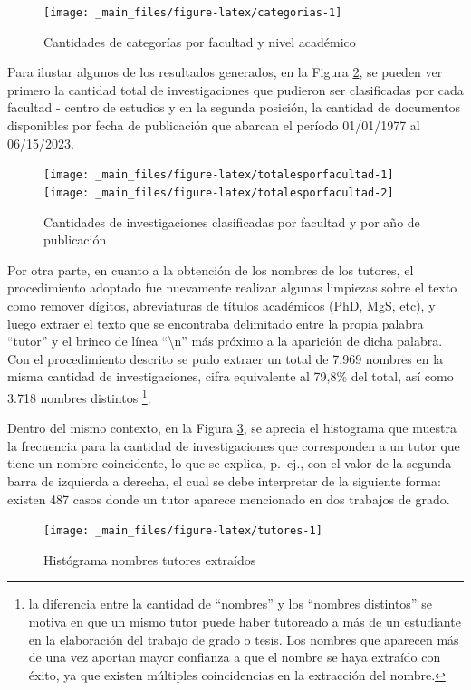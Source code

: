 \documentclass[
  12pt,
  openany]{book}
\begin{document}
\begin{figure}
\texttt{[image: \_main\_files/figure-latex/categorias-1]} \caption{Cantidades de categorías por facultad y nivel académico}\label{fig:categorias}
\end{figure}

Para ilustar algunos de los resultados generados, en la Figura \ref{fig:totalesporfacultad}, se pueden ver primero la cantidad total de investigaciones que pudieron ser clasificadas por cada facultad - centro de estudios y en la segunda posición, la cantidad de documentos disponibles por fecha de publicación que abarcan el período 01/01/1977 al 06/15/2023.

\begin{figure}
\texttt{[image: \_main\_files/figure-latex/totalesporfacultad-1]} \texttt{[image: \_main\_files/figure-latex/totalesporfacultad-2]} \caption{Cantidades de investigaciones clasificadas por facultad y por año de publicación}\label{fig:totalesporfacultad}
\end{figure}

Por otra parte, en cuanto a la obtención de los nombres de los tutores, el procedimiento adoptado fue nuevamente realizar algunas limpiezas sobre el texto como remover dígitos, abreviaturas de títulos académicos (PhD, MgS, etc), y luego extraer el texto que se encontraba delimitado entre la propia palabra ``tutor'' y el brinco de línea ``\textbackslash n'' más próximo a la aparición de dicha palabra. Con el procedimiento descrito se pudo extraer un total de 7.969 nombres en la misma cantidad de investigaciones, cifra equivalente al 79,8\% del total, así como 3.718 nombres distintos \footnote{la diferencia entre la cantidad de ``nombres'' y los ``nombres distintos'' se motiva en que un mismo tutor puede haber tutoreado a más de un estudiante en la elaboración del trabajo de grado o tesis. Los nombres que aparecen más de una vez aportan mayor confianza a que el nombre se haya extraído con éxito, ya que existen múltiples coincidencias en la extracción del nombre.}.

Dentro del mismo contexto, en la Figura \ref{fig:tutores}, se aprecia el histograma que muestra la frecuencia para la cantidad de investigaciones que corresponden a un tutor que tiene un nombre coincidente, lo que se explica, p.~ej., con el valor de la segunda barra de izquierda a derecha, el cual se debe interpretar de la siguiente forma: existen 487 casos donde un tutor aparece mencionado en dos trabajos de grado.

\begin{figure}
\texttt{[image: \_main\_files/figure-latex/tutores-1]} \caption{Histógrama nombres tutores extraídos }\label{fig:tutores}
\end{figure}
\end{document}
